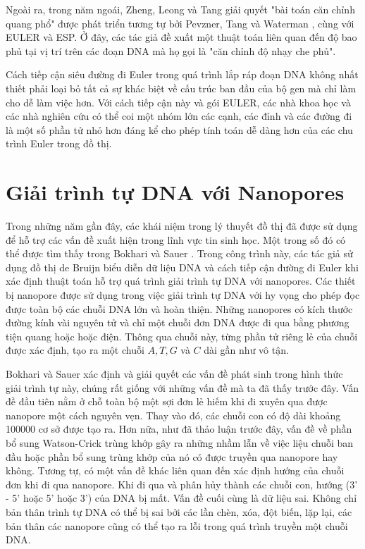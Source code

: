 \documentclass[14pt, a4paper]{article}
\numberwithin{equation}{section}
\numberwithin{figure}{section}
\numberwithin{dl}{section}
\numberwithin{md}{section}
\numberwithin{bd}{section}
\numberwithin{dn}{section}
\numberwithin{hq}{section}
\begin{document}
    Ngoài ra, trong năm ngoái, Zheng, Leong và Tang \cite{zhengimproved} giải quyết "bài toán căn chỉnh quang phổ" được phát triển tương tự bởi Pevzner, Tang và Waterman \cite{pevzner2001eulerian}, \cite{pevzner2001new} cùng với EULER và ESP.
    Ở đây, các tác giả đề xuất một thuật toán liên quan đến độ bao phủ tại vị trí trên các đoạn DNA mà họ gọi là "căn chỉnh độ nhạy che phủ".

    Cách tiếp cận siêu đường đi Euler trong quá trình lắp ráp đoạn DNA không nhất thiết phải loại bỏ tất cả sự khác biệt về cấu trúc ban đầu của bộ gen mà chỉ làm cho dễ làm việc hơn.
    Với cách tiếp cận này và gói EULER, các nhà khoa học và các nhà nghiên cứu có thể coi một nhóm lớn các cạnh, các đỉnh và các đường đi là một số phần tử nhỏ hơn đáng kể cho phép tính toán dễ dàng hơn của các chu trình Euler trong đồ thị.

    \section{Giải trình tự DNA với Nanopores}

    Trong những năm gần đây, các khái niệm trong lý thuyết đồ thị đã được sử dụng để hỗ trợ các vấn đề xuất hiện trong lĩnh vực tin sinh học.
    Một trong số đó có thể được tìm thấy trong Bokhari và Sauer \cite{bokhari2005parallel}.
    Trong công trình này, các tác giả sử dụng đồ thị de Bruijn biểu diễn dữ liệu DNA và cách tiếp cận đường đi Euler khi xác định thuật toán hỗ trợ quá trình giải trình tự DNA với nanopores.
    Các thiết bị nanopore được sử dụng trong việc giải trình tự DNA với hy vọng cho phép đọc được toàn bộ các chuỗi DNA lớn và hoàn thiện.
    Những nanopores có kích thước đường kính vài nguyên tử và chỉ một chuỗi đơn DNA được đi qua bằng phương tiện quang hoặc hoặc điện.
    Thông qua chuỗi này, từng phần tử riêng lẻ của chuỗi được xác định, tạo ra một chuỗi $A, T, G$ và $C$ dài gần như vô tận.
    

    Bokhari và Sauer \cite{bokhari2005parallel} xác định và giải quyết các vấn đề phát sinh trong hình thức giải trình tự này, chúng rất giống với những vấn đề mà ta đã thấy trước đây.
    Vấn đề đầu tiên nằm ở chỗ toàn bộ một sợi đơn lẻ hiếm khi đi xuyên qua được nanopore một cách nguyên vẹn.
    Thay vào đó, các chuỗi con có độ dài khoảng 100000 cơ sở được tạo ra.
    Hơn nữa, như đã thảo luận trước đây, vấn đề về phần bổ sung Watson-Crick trùng khớp gây ra những nhầm lẫn về việc liệu chuỗi ban đầu hoặc phần bổ sung trùng khớp của nó có được truyền qua nanopore hay không.
    Tương tự, có một vấn đề khác liên quan đến xác định hướng của chuỗi đơn khi đi qua nanopore.
    Khi đi qua và phân hủy thành các chuỗi con, hướng (3' - 5' hoặc 5' hoặc 3') của DNA bị mất.
    Vấn đề cuối cùng là dữ liệu sai.
    Không chỉ bản thân trình tự DNA có thể bị sai bởi các lần chèn, xóa, đột biến, lặp lại, các bản thân các nanopore cũng có thể tạo ra lỗi trong quá trình truyền một chuỗi DNA.
\end{document}
